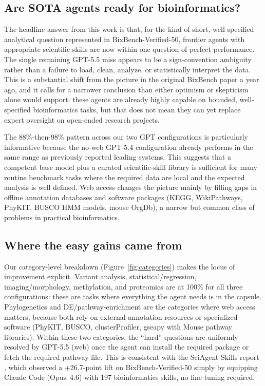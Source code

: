 \documentclass[11pt]{article}
\begin{document}
\subsection{Are SOTA agents ready for bioinformatics?}

The headline answer from this work is that, for the kind of short,
well-specified analytical question represented in BixBench-Verified-50,
frontier agents with appropriate scientific skills are now within one
question of perfect performance. The single remaining GPT-5.5 miss appears
to be a sign-convention ambiguity rather than a failure to load, clean,
analyze, or statistically interpret the data. This is a substantial shift
from the picture in the original BixBench paper a year ago, and it calls
for a narrower conclusion than either optimism or skepticism alone would
support: these agents are already highly capable on bounded,
well-specified bioinformatics tasks, but that does not mean they can yet
replace expert oversight on open-ended research projects.

The 88\%-then-98\% pattern across our two GPT configurations is
particularly informative because the no-web GPT-5.4 configuration already
performs in the same range as previously reported leading systems. This
suggests that a competent base model plus a curated scientific-skill
library is sufficient for many routine benchmark tasks where the required
data are local and the expected analysis is well defined. Web access
changes the picture mainly by filling gaps in offline annotation
databases and software packages (KEGG, WikiPathways, PhyKIT, BUSCO HMM
models, mouse OrgDb), a narrow but common class of problems in practical
bioinformatics.

\subsection{Where the easy gains came from}

Our category-level breakdown (Figure~\ref{fig:categories}) makes the
locus of improvement explicit. Variant analysis, statistical/regression,
imaging/morphology, methylation, and proteomics are at 100\% for all
three configurations: these are tasks where everything the agent needs
is in the capsule. Phylogenetics and DE/pathway-enrichment are the
categories where web access matters, because both rely on external
annotation resources or specialized software (PhyKIT, BUSCO,
clusterProfiler, gseapy with Mouse pathway libraries). Within these
two categories, the ``hard'' questions are uniformly resolved by GPT-5.5
(web) once the agent can install the required package or fetch the
required pathway file. This is consistent with the SciAgent-Skills
report \citep{sciagent2026}, which observed a +26.7-point lift on
BixBench-Verified-50 simply by equipping Claude Code (Opus~4.6) with
197 bioinformatics skills, no fine-tuning required.
\end{document}
